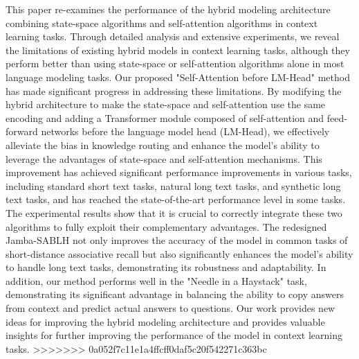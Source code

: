\documentclass{article}
\theoremstyle{plain}
\theoremstyle{definition}
\theoremstyle{remark}
\begin{document}
This paper re-examines the performance of the hybrid modeling architecture combining state-space algorithms and self-attention algorithms in context learning tasks. Through detailed analysis and extensive experiments, we reveal the limitations of existing hybrid models in context learning tasks, although they perform better than using state-space or self-attention algorithms alone in most language modeling tasks.
Our proposed "Self-Attention before LM-Head" method has made significant progress in addressing these limitations. By modifying the hybrid architecture to make the state-space and self-attention use the same encoding and adding a Transformer module composed of self-attention and feed-forward networks before the language model head (LM-Head), we effectively alleviate the bias in knowledge routing and enhance the model's ability to leverage the advantages of state-space and self-attention mechanisms. This improvement has achieved significant performance improvements in various tasks, including standard short text tasks, natural long text tasks, and synthetic long text tasks, and has reached the state-of-the-art performance level in some tasks.
The experimental results show that it is crucial to correctly integrate these two algorithms to fully exploit their complementary advantages. The redesigned Jamba-SABLH not only improves the accuracy of the model in common tasks of short-distance associative recall but also significantly enhances the model's ability to handle long text tasks, demonstrating its robustness and adaptability. In addition, our method performs well in the "Needle in a Haystack" task, demonstrating its significant advantage in balancing the ability to copy answers from context and predict actual answers to questions.
Our work provides new ideas for improving the hybrid modeling architecture and provides valuable insights for further improving the performance of the model in context learning tasks.
>>>>>>> 0a052f7c11e1a4ffcff0daf5c20f542271c363bc



\end{document}
